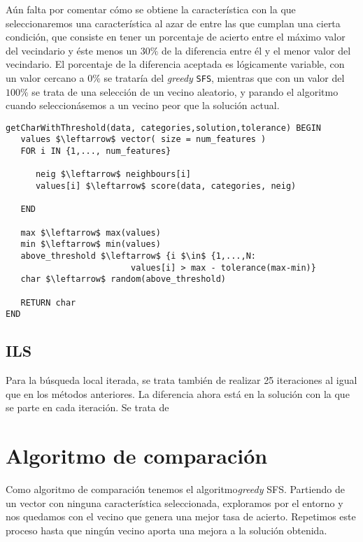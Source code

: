 \documentclass[11pt,leqno]{article}
\begin{document}
	Aún falta por comentar cómo se obtiene la característica con la que seleccionaremos una característica al azar de entre las que cumplan una cierta condición, que consiste en tener un porcentaje de acierto entre el máximo valor del vecindario y éste menos un $30\%$ de la diferencia entre él y el menor valor del vecindario. El porcentaje de la diferencia aceptada es lógicamente variable, con un valor cercano a $0\%$ se trataría del \textit{greedy} \texttt{SFS}, mientras que con un valor del $100\%$ se trata de una selección de un vecino aleatorio, y parando el algoritmo cuando seleccionásemos a un vecino peor que la solución actual.
	
	\begin{lstlisting}[mathescape=true]
getCharWithThreshold(data, categories,solution,tolerance) BEGIN
   values $\leftarrow$ vector( size = num_features )
   FOR i IN {1,..., num_features}
      
      neig $\leftarrow$ neighbours[i]
      values[i] $\leftarrow$ score(data, categories, neig)
   
   END
   
   max $\leftarrow$ max(values)
   min $\leftarrow$ min(values)   
   above_threshold $\leftarrow$ {i $\in$ {1,...,N: 
                         values[i] > max - tolerance(max-min)}
   char $\leftarrow$ random(above_threshold)
   
   RETURN char 
END
	\end{lstlisting}
	
	
	
\subsection{ILS}

	Para la búsqueda local iterada, se trata también de realizar 25 iteraciones al igual que en los métodos anteriores. La diferencia ahora está en la solución con la que se parte en cada iteración. Se trata de 

\section{Algoritmo de comparación}

Como algoritmo de comparación tenemos el algoritmo\textit{greedy} SFS. Partiendo de un vector con ninguna característica seleccionada, exploramos por el entorno y nos quedamos con el vecino que genera una mejor tasa de acierto. Repetimos este proceso hasta que ningún vecino aporta una mejora a la solución obtenida.
\end{document}
